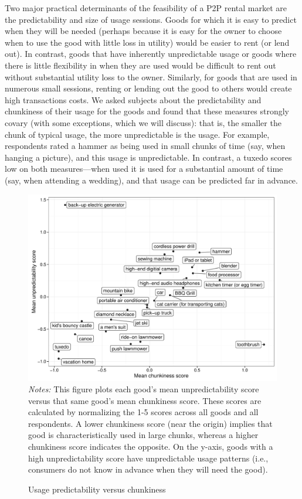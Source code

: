 \documentclass[11pt]{article}
\begin{document}
Two major practical determinants of the feasibility of a P2P rental market are the predictability and size of usage sessions.
Goods for which it is easy to predict when they will be needed (perhaps because it is easy for the owner to choose when to use the good with little loss in utility) would be easier to rent (or lend out).
In contrast, goods that have inherently unpredictable usage or goods where there is little flexibility in when they are used would be difficult to rent out without substantial utility loss to the owner.
Similarly, for goods that are used in numerous small sessions, renting or lending out the good to others would create high transactions costs.
We asked subjects about the predictability and chunkiness of their usage for the goods and found that these measures strongly covary (with some exceptions, which we will discuss):
that is, the smaller the chunk of typical usage, the more unpredictable is the usage.
For example, respondents rated a hammer as being used in small chunks of time (say, when hanging a picture), and this usage is unpredictable. 
In contrast, a tuxedo scores low on both measures---when used it is used for a substantial amount of time (say, when attending a wedding), and that usage can be predicted far in advance.  

\begin{figure}
\centering 
\caption{Usage predictability versus chunkiness \label{fig:granularity_v_predictability}}
\begin{minipage}{0.90 \linewidth}
  \includegraphics[width = \linewidth]{./plots/granularity_versus_predictability.pdf} \\
  {\footnotesize 
    \emph{Notes:} This figure plots each good's mean unpredictability score versus that same good's mean chunkiness score.
    These scores are calculated by normalizing the 1-5 scores across all goods and all respondents.
    A lower chunkiness score (near the origin) implies that good is characteristically used in large chunks, whereas a higher chunkiness score indicates the opposite.
    On the y-axis, goods with a high unpredictability score have unpredictable usage patterns (i.e., consumers do not know in advance when they will need the good). 
   }
\end{minipage} 
\end{figure} 
\end{document}
